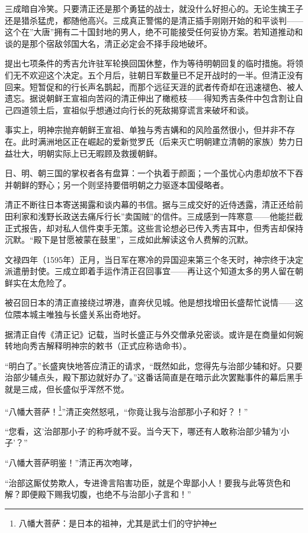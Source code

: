 \documentclass[
]{article}
\begin{document}
三成暗自冷笑。只要清正还是那个勇猛的战士，就没什么好担心的。无论生擒王子还是猎杀猛虎，都随他高兴。三成真正警惕的是清正插手刚刚开始的和平谈判------这个在''大唐''拥有二十国封地的男人，绝不可能接受任何妥协方案。若知道推动和谈的是那个宿敌邻国大名，清正必定会不择手段地破坏。

提出七项条件的秀吉允许驻军轮换回国休整，作为等待明朝回复的临时措施。将领们无不欢迎这个决定。五个月后，驻朝日军数量已不足开战时的一半。但清正没有回来。短暂促和的行长声名鹊起，而那个远征天涯的武者传奇却在迅速褪色、被人遗忘。据说朝鲜王宣祖向苦闷的清正伸出了橄榄枝------得知秀吉条件中包含割让自己四道领土后，宣祖似乎想通过向行长的死敌揭穿谎言来破坏和谈。

事实上，明神宗抛弃朝鲜王宣祖、单独与秀吉媾和的风险虽然很小，但并非不存在。此时满洲地区正在崛起的爱新觉罗氏（后来灭亡明朝建立清朝的家族）势力日益壮大，明朝实际上已无暇顾及救援朝鲜。

日、明、朝三国的掌权者各有盘算：一个执着于颜面；一个虽忧心内患却放不下吞并朝鲜的野心；另一个则坚持要借明朝之力驱逐本国侵略者。

清正不断往日本寄送揭露和谈内幕的书信。据与三成交好的近侍透露，清正还给前田利家和浅野长政送去痛斥行长''卖国贼''的信件。三成感到一阵寒意------他能拦截正式报告，却对私人信件束手无策。这些言论想必已传入秀吉耳中，但秀吉却保持沉默。``殿下是甘愿被蒙在鼓里''，三成如此解读这令人费解的沉默。

文禄四年（1595年）正月，当日军在寒冷的异国迎来第三个冬天时，神宗终于决定派遣册封使。三成立即着手运作清正召回事宜------再让这个知道太多的男人留在朝鲜实在太危险了。

被召回日本的清正直接绕过堺港，直奔伏见城。他是想找增田长盛帮忙说情------这位隈本城主唯独与长盛关系出奇地好。

据清正自传《清正记》记载，当时长盛正与外交僧承兑密谈。或许是在商量如何婉转地向秀吉解释明神宗的敕书（正式应称诰命书）。

``明白了。''长盛爽快地答应清正的请求，``既然如此，您得先与治部少辅和好。只要治部少辅点头，殿下那边就好办了。''这番话简直是在暗示此次罢黜事件的幕后黑手就是三成，但长盛似乎浑然不觉。

``八幡大菩萨！\footnote{八幡大菩萨：是日本的祖神，尤其是武士们的守护神}''清正突然怒吼，``你竟让我与治部那小子和好？！''

``您看，这'治部那小子'的称呼就不妥。当今天下，哪还有人敢称治部少辅为'小子'？''

``八幡大菩萨明鉴！''清正再次咆哮，

``治部这厮仗势欺人，专进谗言陷害功臣，就是个卑鄙小人！要我与此等货色和解？即便殿下赐我切腹，也绝不与治部小子言和！''
\end{document}
